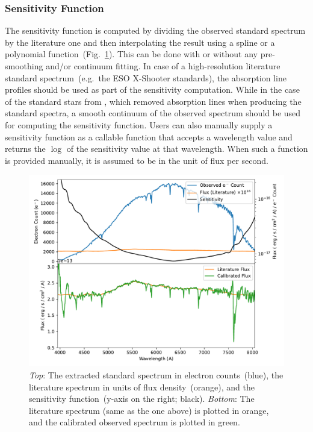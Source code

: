 \documentclass[linenumbers, twocolumn]{aastex631}
\begin{document}
\subsubsection*{Sensitivity Function}
The sensitivity function is computed by dividing the observed standard spectrum
by the literature one and then interpolating the result using a spline or a
polynomial function~(Fig.~\ref{fig:fluxcal}). This can be done with or without
any pre-smoothing and/or continuum fitting. In case of a high-resolution
literature standard spectrum~(e.g.\ the ESO X-Shooter standards), the
absorption line profiles should be used as part of the sensitivity computation.
While in the case of the standard stars from \citet{1990AJ.....99.1621O},
which removed absorption lines when producing the standard spectra, a
smooth continuum of the observed spectrum should be used for computing
the sensitivity function. Users can also manually supply a sensitivity function
as a callable function that accepts a wavelength value and returns the $\log$
of the sensitivity value at that wavelength. When such a function is provided
manually, it is assumed to be in the unit of flux per second.

\begin{figure}
    \centering
    \includegraphics[width=\columnwidth]{fig_06_flux_calibration_diagnostics.pdf}
    \caption{\textit{Top}: The extracted standard spectrum in electron
    counts~(blue), the literature spectrum in units of flux density~(orange),
    and the sensitivity function~(y-axis on the right; black). \textit{Bottom}:
    The literature spectrum (same as the one above) is plotted in orange, and
    the calibrated observed spectrum is plotted in green.}
    \label{fig:fluxcal}
\end{figure}
\end{document}
